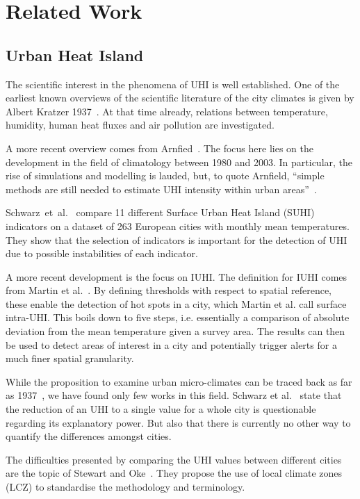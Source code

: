 \documentclass{itatnew}
\begin{document}
\section{Related Work}

\subsection{Urban Heat Island}

The scientific interest in the phenomena of UHI is well established. One of the
earliest known overviews of the scientific literature of the city climates is
given by Albert Kratzer 1937~\cite{dieckmann1938stadtklima}. At that time
already, relations between temperature, humidity, human heat fluxes and air
pollution are investigated.

A more recent overview comes from Arnfied~\cite{Arnfield.2003}. The focus here
lies on the development in the field of climatology between 1980 and 2003. In
particular, the rise of simulations and modelling is lauded, but, to quote
Arnfield, ``simple methods are still needed to estimate UHI intensity within
urban areas''~\cite{Arnfield.2003}.

Schwarz~et~al.~\cite{Schwarz.2011} compare 11 different Surface Urban Heat
Island (SUHI) indicators on a dataset of 263 European cities with monthly mean
temperatures. They show that the selection of indicators is important for the
detection of UHI due to possible instabilities of each indicator.

A more recent development is the focus on IUHI. The definition for IUHI comes
from Martin et al.~\cite{Martin.2015}. By defining thresholds with respect to
spatial reference, these enable the detection of hot spots in a city, which
Martin et al. call surface intra-UHI. This boils down to five steps, i.e.
essentially a comparison of absolute deviation from the mean temperature given a
survey area. The results can then be used to detect areas of interest in a city
and potentially trigger alerts for a much finer spatial granularity.

While the proposition to examine urban micro-climates can be traced back as far
as 1937~\cite{dieckmann1938stadtklima}, we have found only few works in this
field. Schwarz et al.~\cite{Schwarz.2012} state that the reduction of an UHI to
a single value for a whole city is questionable regarding its explanatory power.
But also that there is currently no other way to quantify the differences
amongst cities.

The difficulties presented by comparing the UHI values between different cities
are the topic of Stewart and Oke~\cite{Stewart2012}. They propose the use of
local climate zones (LCZ) to standardise the methodology and terminology.
\end{document}
